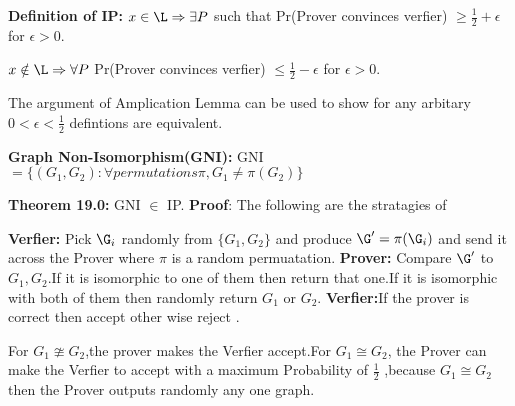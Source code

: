 \textbf {Definition of IP:}
\newline $ x \in \L  \Rightarrow \exists P $ such that Pr(Prover convinces verfier) $ \geq \frac{1}{2}+\epsilon $ for $ \epsilon >0$.

 $ x \notin \L  \Rightarrow \forall P$  Pr(Prover convinces verfier)  $\leq \frac{1}{2}-\epsilon $ for $ \epsilon >0$.

The  argument of Amplication Lemma can be used to show for any arbitary $0<\epsilon<\frac{1}{2}$ defintions are equivalent.

 \textbf {Graph Non-Isomorphism(GNI):}
\newline GNI$= \{(G_{1},G_{2}):\forall permutations \pi ,G_{1}\neq \pi(G_{2})\}$

 \textbf {Theorem 19.0:}  GNI $\in $ IP.
\newline \textbf{Proof}: The following are the stratagies of 

 \textbf{Verfier:} Pick $\G_{i}$ randomly from $\{G_{1},G_{2}\}$ and produce $\G^\prime =\pi(\G_{i})$ and send it across the Prover where $\pi$ is a random permuatation.
\newline \textbf{Prover:} Compare $\G^\prime$ to $G_{1},G_{2}$.If it is isomorphic to one of them then return that one.If it is isomorphic with both of them then randomly return $G_{1}$ or $G_{2}$.
\newline \textbf{Verfier:}If the prover is correct then accept other wise reject .

 For $G_{1}\ncong G_{2}$,the prover makes the Verfier accept.For $G_{1}\cong G_{2}$, the Prover can make the Verfier to accept with a maximum Probability of $\frac{1}{2}$ ,because $G_{1}\cong G_{2}$ then the Prover outputs randomly any one graph.
